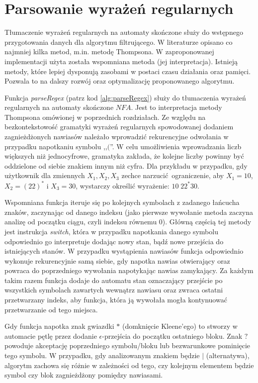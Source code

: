 \section{Parsowanie wyrażeń regularnych}
\par
Tłumaczenie wyrażeń regularnych na automaty skończone służy do wstępnego przygotowania danych dla algorytmu filtrującego.
W literaturze opisano co najmniej kilka metod, m.in. metodę Thompsona. W zaproponowanej implementacji użyta została
wspomniana metoda (jej interpretacja). Istnieją metody, które lepiej dysponują zasobami w postaci czasu działania oraz pamięci.
Pozwala to na dalszy rozwój oraz optymalizację proponowanego algorytmu.
\par
Funkcja \textit{parseRegex} (patrz kod \ref{alg:parseRegex}) służy do tłumaczenia wyrażeń regularnych na automaty skończone $NFA$. Jest to interpretacja
metody Thompsona omówionej w poprzednich rozdziałach. Ze względu na bezkontekstowość gramatyki wyrażeń regularnych spowodowanej
dodaniem zagnieżdżonych nawiasów należało wprowadzić rekurencyjne odwołania w przypadku napotkaniu symbolu ,,$($''. W celu
umożliwienia wprowadzania liczb większych niż jednocyfrowe, gramatyka zakłada, że kolejne liczby powinny być oddzielone od
siebie znakiem innym niż cyfra. Dla przykładu w przypadku, gdy użytkownik dla zmiennych $X_1, X_2, X_3$ zechce narzucić ograniczenie,
aby $X_1 = 10$, $X_2 = (22)^*$ i $X_3 = 30$, wystarczy określić wyrażenie: $10 \; 22^*30$.
\par
Wspomniana funkcja iteruje się po kolejnych symbolach z zadanego łańcucha znaków, zaczynając od danego indeksu (jako pierwsze wywołanie
metoda zaczyna analizę od początku ciągu, czyli indeksu równemu $0$). Główną częścią tej metody jest instrukcja \textit{switch},
która w przypadku napotkania danego symbolu odpowiednio go interpretuje dodając nowy stan, bądź nowe przejścia do istniejących stanów.
W przypadku wystąpienia nawiasów funkcja odpowiednio wykonuje rekurencyjnie samą siebie, gdy napotka nawias otwierający oraz powraca
do poprzedniego wywołania napotykając nawias zamykający. Za każdym takim razem funkcja dodaje do automatu stan oznaczający przejście po wszystkich
symbolach zawartych wewnątrz nawiasu oraz zwraca ostatni przetwarzany indeks, aby funkcja, która ją wywołała mogła kontynuować przetwarzanie
od tego miejsca.
\par
Gdy funkcja napotka znak gwiazdki $*$ (domknięcie Kleene'ego) to stworzy w automacie pętlę przez dodanie $\epsilon$-przejścia do początku
ostatniego bloku. Znak $?$ powoduje akceptację poprzedniego symbolu/bloku lub bezwarunkowe pominięcie tego symbolu. W przypadku,
gdy analizowanym znakiem będzie $|$ (alternatywa), algorytm zachowa się różnie w zależności od tego, czy kolejnym elementem będzie
symbol czy blok zagnieżdżony pomiędzy nawiasami.


